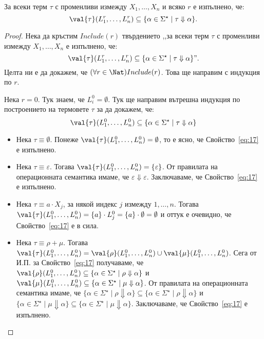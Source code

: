 \begin{lemma}
  За всеки терм $\tau$ с променливи измежду $X_1,\dots,X_n$ и всяко $r$ е изпълнено, че:
  \[\val{\tau}(L^r_1,\dots,L^r_n) \subseteq \{\alpha \in \Sigma^\star \mid \tau \Downarrow \alpha\}.\]
\end{lemma}
\begin{proof}
  Нека да кръстим $Include(r)$ твърдението
  ,,за всеки терм $\tau$ с променливи измежду $X_1,\dots,X_n$ е изпълнено, че:
  \[\val{\tau}(L^r_1,\dots,L^r_n) \subseteq \{\alpha \in \Sigma^\star \mid \tau \Downarrow \alpha\}".\]
  Целта ни е да докажем, че $(\forall r\in\Nat)Include(r)$. Това ще направим с индукция по $r$.
  
  Нека $r = 0$. Тук знаем, че $L^0_i = \emptyset$. Тук ще направим вътрешна индукция по построението на термовете $\tau$ за да докажем, че:
  \begin{equation}
    \label{eq:17}
    \val{\tau}(L^0_1,\dots,L^0_n) \subseteq \{\alpha \in \Sigma^\star \mid \tau \Downarrow \alpha\}
  \end{equation}
  \begin{itemize}
  \item
    Нека $\tau \equiv \emptyset$. Понеже $\val{\tau}(L^0_1,\dots,L^0_n) = \emptyset$, то е ясно, че Свойство~\ref{eq:17} е изпълнено.
  \item
    Нека $\tau \equiv \varepsilon$. Тогава $\val{\tau}(L^0_1,\dots,L^0_n) = \{\varepsilon\}$.
    От правилата на операционната семантика имаме, че $\varepsilon \Downarrow \varepsilon$.
    Заключаваме, че Свойство~\ref{eq:17} е изпълнено.
  \item
    Нека $\tau \equiv a \cdot X_j$, за някой индекс $j$ измежду $1,\dots,n$.
    Тогава $\val{\tau}(L^0_1,\dots,L^0_n) = \{a\}\cdot L^0_j = \{a\} \cdot \emptyset = \emptyset$ и оттук е очевидно, че Свойство~\ref{eq:17} е в сила.
  \item
    Нека $\tau \equiv \rho + \mu$. Тогава $\val{\tau}(L^0_1,\dots,L^0_n) = \val{\rho}(L^0_1,\dots,L^0_n) \cup \val{\mu}(L^0_1,\dots,L^0_n)$. Сега от И.П. за Свойство~\ref{eq:17} получаваме, че
    $\val{\rho}(L^0_1,\dots,L^0_n) \subseteq \{\alpha \in \Sigma^\star \mid \rho \Downarrow \alpha\}$ и
    $\val{\mu}(L^0_1,\dots,L^0_n) \subseteq \{\alpha \in \Sigma^\star \mid \mu \Downarrow \alpha\}$.
    От правилата на операционната семантика имаме, че
    $\{\alpha \in \Sigma^\star \mid \rho \Downarrow \alpha\} \subseteq \{\alpha \in \Sigma^\star \mid \rho \Downarrow \alpha\}$ и 
    $\{\alpha \in \Sigma^\star \mid \mu \Downarrow \alpha\} \subseteq \{\alpha \in \Sigma^\star \mid \mu \Downarrow \alpha\}$.
    Заключаваме, че Свойство~\ref{eq:17} е изпълнено.
  \end{itemize}


\end{proof}
